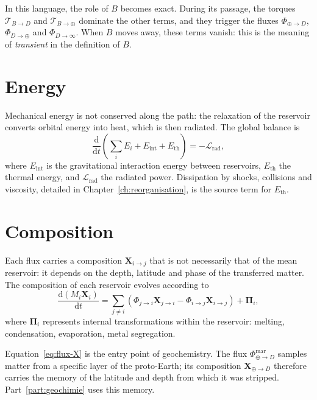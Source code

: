 \documentclass[11pt,a4paper,openany]{report}
\newcommand{\dd}{\mathrm{d}}
\begin{document}
\begin{ideephys}
In this language, the role of $B$ becomes exact. During its passage, the torques
$\boldsymbol{\mathcal{T}}_{B\to D}$ and $\boldsymbol{\mathcal{T}}_{B\to\oplus}$ dominate the other terms,
and they trigger the fluxes $\Phi_{\oplus\to D}$, $\Phi_{D\to\oplus}$ and $\Phi_{D\to\infty}$. When
$B$ moves away, these terms vanish: this is the meaning of \emph{transient} in the definition of
$B$.
\end{ideephys}

\section{Energy}

Mechanical energy is not conserved along the path: the relaxation of the reservoir converts
orbital energy into heat, which is then radiated. The global balance is
\begin{equation}
\frac{\dd}{\dd t}\left(\sum_iE_i+E_{\mathrm{int}}+E_{\mathrm{th}}\right)=-\mathcal{L}_{\mathrm{rad}},
\label{eq:energie}
\end{equation}
where $E_{\mathrm{int}}$ is the gravitational interaction energy between reservoirs,
$E_{\mathrm{th}}$ the thermal energy, and $\mathcal{L}_{\mathrm{rad}}$ the radiated power.
Dissipation by shocks, collisions and viscosity, detailed in Chapter~\ref{ch:reorganisation}, is
the source term for $E_{\mathrm{th}}$.

\section{Composition}

Each flux carries a composition $\mathbf{X}_{i\to j}$ that is not necessarily that of the mean
reservoir: it depends on the depth, latitude and phase of the transferred matter. The composition
of each reservoir evolves according to
\begin{equation}
\frac{\dd(M_i\mathbf{X}_i)}{\dd t}=\sum_{j\neq i}\left(\Phi_{j\to i}\mathbf{X}_{j\to i}
-\Phi_{i\to j}\mathbf{X}_{i\to j}\right)+\boldsymbol{\Pi}_i,
\label{eq:flux-X}
\end{equation}
where $\boldsymbol{\Pi}_i$ represents internal transformations within the reservoir: melting,
condensation, evaporation, metal segregation.

\begin{lecture}
Equation~\eqref{eq:flux-X} is the entry point of geochemistry. The flux
$\Phi_{\oplus\to D}^{\mathrm{mar}}$ samples matter from a specific layer of the proto-Earth; its
composition $\mathbf{X}_{\oplus\to D}$ therefore carries the memory of the latitude and depth from
which it was stripped. Part~\ref{part:geochimie} uses this memory.
\end{lecture}
\end{document}
